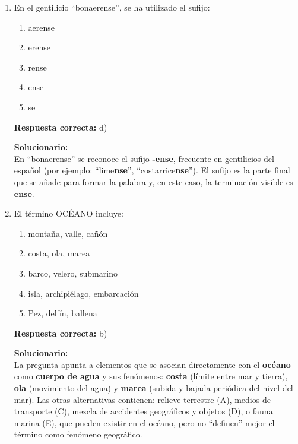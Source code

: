 \begin{enumerate}

\item En el gentilicio ``bonaerense'', se ha utilizado el sufijo:
\begin{enumerate}[label=\alph*)]
	\item aerense
	\item erense
	\item rense
	\item ense
	\item se
\end{enumerate}

\textbf{Respuesta correcta:} d)

\vspace{2mm}
\textbf{Solucionario:}\\
En “bonaerense” se reconoce el sufijo \textbf{-ense}, frecuente en gentilicios del español (por ejemplo: “lime\textbf{nse}”, “costarrice\textbf{nse}”). 
El sufijo es la parte final que se añade para formar la palabra y, en este caso, la terminación visible es \textbf{ense}.


\item El término OCÉANO incluye:
\begin{enumerate}[label=\alph*)]
	\item montaña, valle, cañón
	\item costa, ola, marea
	\item barco, velero, submarino
	\item isla, archipiélago, embarcación
	\item Pez, delfín, ballena
\end{enumerate}

\textbf{Respuesta correcta:} b)

\vspace{2mm}
\textbf{Solucionario:}\\
La pregunta apunta a elementos que se asocian directamente con el \textbf{océano} como \textbf{cuerpo de agua} y sus fenómenos:
\textbf{costa} (límite entre mar y tierra), \textbf{ola} (movimiento del agua) y \textbf{marea} (subida y bajada periódica del nivel del mar).
Las otras alternativas contienen: relieve terrestre (A), medios de transporte (C), mezcla de accidentes geográficos y objetos (D), o fauna marina (E), que pueden existir en el océano, pero no “definen” mejor el término como fenómeno geográfico.



\end{enumerate}
